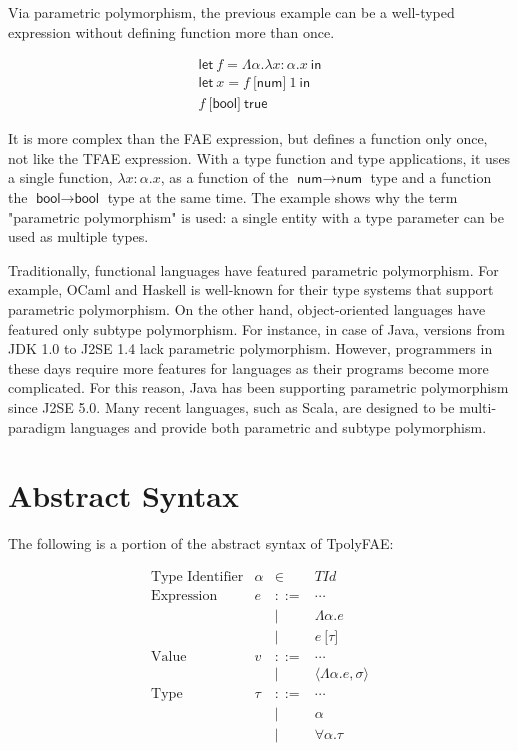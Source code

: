 Via parametric polymorphism, the previous example can be a well-typed
expression without defining function more than once.

\[
\begin{array}{l}
\textsf{let}\ f=\Lambda\alpha.\lambda x:\alpha.x\ \textsf{in} \\
\textsf{let}\ x=f\ \lbrack\textsf{num}\rbrack\ 1\ \textsf{in} \\
f\ \lbrack\textsf{bool}\rbrack\ \textsf{true}
\end{array}
\]

It is more complex than the FAE expression, but defines a function only once,
not like the TFAE expression. With a type function and type applications, it
uses a single function, $\lambda x:\alpha.x$, as a function of the \(\textsf{
num}\rightarrow\textsf{num}\) type and a function the
\(\textsf{bool}\rightarrow\textsf{
bool}\) type at the same time. The example shows why the term "parametric
polymorphism" is used: a single entity with a type parameter can be used as
multiple types.

Traditionally, functional languages have featured parametric polymorphism. For
example, OCaml and Haskell is well-known for their type systems that support
parametric polymorphism. On the other hand, object-oriented languages have
featured only subtype polymorphism. For instance, in case of Java, versions
from JDK 1.0 to J2SE 1.4 lack parametric polymorphism. However, programmers in
these days require more features for languages as their programs become more
complicated. For this reason, Java has been supporting parametric polymorphism
since J2SE 5.0. Many recent languages, such as Scala, are designed to be
multi-paradigm languages and provide both parametric and subtype polymorphism.

\section{Abstract Syntax}

The following is a portion of the abstract syntax of TpolyFAE:

\[
\begin{array}{rrcl}
\text{Type Identifier} & \alpha & \in & \mathit{TId} \\
\text{Expression} & e & ::= & \cdots \\
&&|& \Lambda\alpha.e \\
&&|& e\ \lbrack\tau\rbrack \\
\text{Value} & v & ::= & \cdots \\
&&|& \langle \Lambda\alpha.e,\sigma\rangle \\
\text{Type} & \tau & ::= & \cdots \\
&&|& \alpha \\
&&|& \forall\alpha.\tau \\
\end{array}
\]

